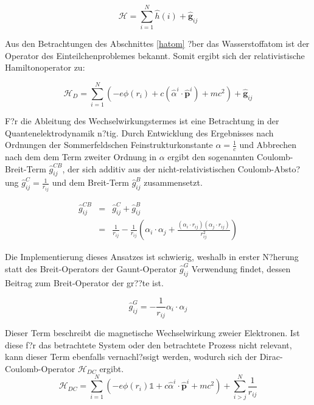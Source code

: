 \begin{equation}
\mathcal{H}= \sum\limits_{i=1}^N \hat{h}(i) + \mathbf{\hat{g}}_{ij}
\end{equation}

Aus den Betrachtungen des Abschnittes \ref{hatom} ?ber das Wasserstoffatom ist der Operator des Einteilchenproblemes bekannt. Somit ergibt sich der relativistische Hamiltonoperator zu:

\begin{equation}
\mathcal{H}_{D}= \sum\limits_{i=1}^N (-e \phi(r_i)+c(\hat{\alpha}^{i}\cdot\hat{\mathbf{p}}^{i})+mc^2) + \mathbf{\hat{g}}_{ij}
\end{equation}

F?r die Ableitung des Wechselwirkungstermes ist eine Betrachtung in der Quantenelektrodynamik n?tig. Durch Entwicklung des Ergebnisses nach Ordnungen der Sommerfeldschen Feinstrukturkonstante $\alpha=\frac1c$ und Abbrechen nach dem dem Term zweiter Ordnung in $\alpha$ ergibt den sogenannten Coulomb-Breit-Term $\hat{g}_{ij}^{CB}$, der sich additiv aus der nicht-relativistischen Coulomb-Absto?ung $\hat{g}_{ij}^C=\frac1{r_{ij}}$ und dem Breit-Term $\hat{g}_{ij}^B$ zusammensetzt.

\begin{equation}\begin{array}{rcl}
\hat{g}_{ij}^{CB} &=& \hat{g}_{ij}^C + \hat{g}_{ij}^B\\
                &=& \frac1{r_{ij}} - \frac1{r_{ij}}\left(\alpha_i\cdot\alpha_j+\frac{(\alpha_i\cdot r_{ij})(\alpha_j\cdot r_{ij})}{r^2_{ij}}\right)
\end{array}\end{equation}

Die Implementierung dieses Ansatzes ist schwierig, weshalb in erster N?herung statt des Breit-Operators der Gaunt-Operator $\hat{g}_{ij}^G$ Verwendung findet, dessen Beitrag zum Breit-Operator der gr??te ist.

\begin{equation}
\hat{g}_{ij}^G = - \frac1{r_{ij}}\alpha_i\cdot\alpha_j
\end{equation}

Dieser Term beschreibt die magnetische Wechselwirkung zweier Elektronen. Ist diese f?r das betrachtete System oder den betrachtete Prozess nicht relevant, kann dieser Term ebenfalls vernachl?ssigt werden, wodurch sich der Dirac-Coulomb-Operator $\mathcal{H}_{DC}$ ergibt.
\begin{equation}\label{DCHamil}
\mathcal{H}_{DC} = \sum\limits_{i=1}^N (-e \phi(r_i)\mathds{1}+c\hat{\alpha}^{i}\cdot\hat{\mathbf{p}}^{i}+mc^2) + \sum\limits_{i>j}^N \frac1{r_{ij}}
\end{equation}




